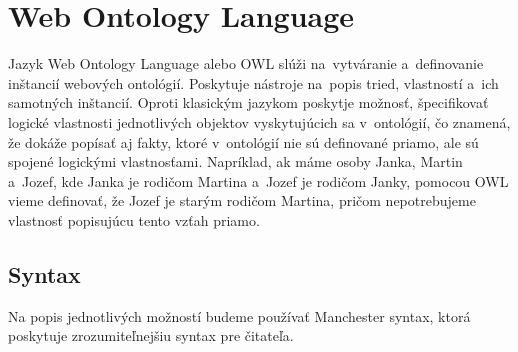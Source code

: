 \documentclass[12pt, a4paper, oneside]{book}
\begin{document}

\section{Web Ontology Language}
Jazyk Web Ontology Language \citep{owl2} alebo OWL slúži na~vytváranie a~definovanie inštancií webových ontológií. Poskytuje nástroje na~popis tried, vlastností a~ich samotných inštancií. Oproti klasickým jazykom poskytje možnosť, špecifikovať logické vlastnosti jednotlivých objektov vyskytujúcich sa v~ontológií, čo znamená, že dokáže popísať aj fakty, ktoré v~ontológií nie sú definované priamo, ale sú spojené logickými vlastnosťami. Napríklad, ak máme osoby Janka, Martin a~Jozef, kde Janka je rodičom Martina a~Jozef je rodičom Janky, pomocou OWL vieme definovať, že Jozef je starým rodičom Martina, pričom nepotrebujeme vlastnosť popisujúcu tento vzťah priamo.













\subsection{Syntax}
Na popis jednotlivých možností budeme používať Manchester syntax, ktorá poskytuje zrozumiteľnejšiu syntax pre čitateľa.
\end{document}
